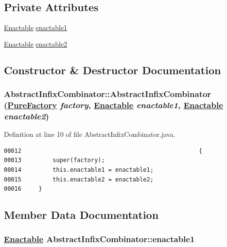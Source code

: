 \subsection*{Private Attributes}
\begin{CompactItemize}
\item 
\hyperlink{interfaceEnactable}{Enactable} \hyperlink{classAbstractInfixCombinator_o0}{enactable1}
\item 
\hyperlink{interfaceEnactable}{Enactable} \hyperlink{classAbstractInfixCombinator_o1}{enactable2}
\end{CompactItemize}


\subsection{Constructor \& Destructor Documentation}
\hypertarget{classAbstractInfixCombinator_c0}{
\subsubsection[AbstractInfixCombinator]{\setlength{\rightskip}{0pt plus 5cm}Abstract\-Infix\-Combinator::Abstract\-Infix\-Combinator (\hyperlink{classPureFactory}{Pure\-Factory} {\em factory}, \hyperlink{interfaceEnactable}{Enactable} {\em enactable1}, \hyperlink{interfaceEnactable}{Enactable} {\em enactable2})}}
\label{classAbstractInfixCombinator_c0}




Definition at line 10 of file Abstract\-Infix\-Combinator.java.\footnotesize\begin{verbatim}00012                                                   {
00013         super(factory);
00014         this.enactable1 = enactable1;
00015         this.enactable2 = enactable2;
00016     }
\end{verbatim}\normalsize 


\subsection{Member Data Documentation}
\hypertarget{classAbstractInfixCombinator_o0}{
\subsubsection[enactable1]{\setlength{\rightskip}{0pt plus 5cm}\hyperlink{interfaceEnactable}{Enactable} Abstract\-Infix\-Combinator::enactable1}}
\label{classAbstractInfixCombinator_o0}




